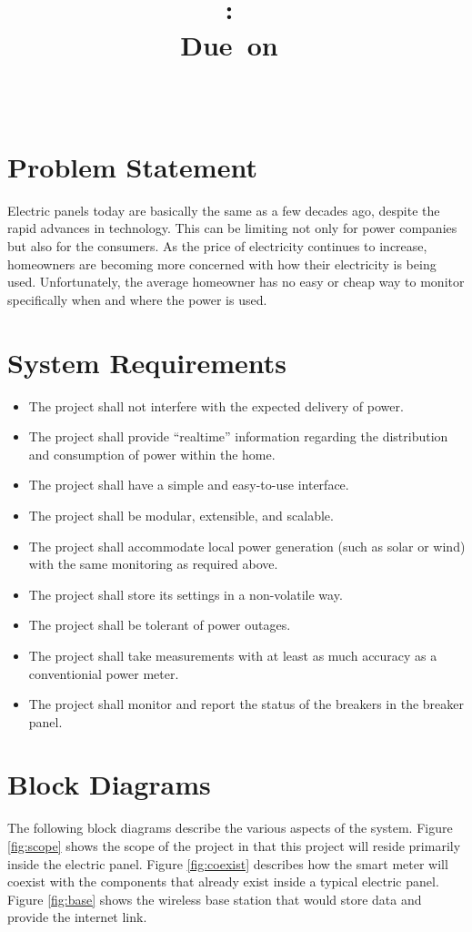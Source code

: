 \documentclass[titlepage,11pt,letterpaper]{article}
\title{\vspace{2in}\textmd{\textbf{\hmwkAuthorName}}\\\normalsize\vspace{0.1in}\hmwkClass:\ \hmwkTitle \vspace{0.1in}\\Due\ on\ \hmwkDueDate\\\vspace{0.1in}\large{\textit{\hmwkClassInstructor\ \hmwkClassTime}}\vspace{3in}}
\date{}
\author{}
\begin{document}
\begin{spacing}{1.1}
\maketitle
\newpage

\section{Problem Statement}
Electric panels today are basically the same as a few decades ago, despite the rapid advances in technology. This can be limiting not only for power companies but also for the consumers. As the price of electricity continues to increase, homeowners are becoming more concerned with how their electricity is being used. Unfortunately, the average homeowner has no easy or cheap way to monitor specifically when and where the power is used.

\section{System Requirements}
\begin{itemize}
 \item The project shall not interfere with the expected delivery of power.
 \item The project shall provide ``realtime'' information regarding the distribution and consumption of power within the home.
 \item The project shall have a simple and easy-to-use interface.
 \item The project shall be modular, extensible, and scalable.
 \item The project shall accommodate local power generation (such as solar or wind) with the same monitoring as required above.
 \item The project shall store its settings in a non-volatile way.
 \item The project shall be tolerant of power outages.
 \item The project shall take measurements with at least as much accuracy as a conventionial power meter.
 \item The project shall monitor and report the status of the breakers in the breaker panel.
\end{itemize}

\section{Block Diagrams}
The following block diagrams describe the various aspects of the system. Figure \ref{fig:scope} shows the scope of the project in that this project will reside primarily inside the electric panel. Figure \ref{fig:coexist} describes how the smart meter will coexist with the components that already exist inside a typical electric panel. Figure \ref{fig:base} shows the wireless base station that would store data and provide the internet link.


\end{spacing}
\end{document}
